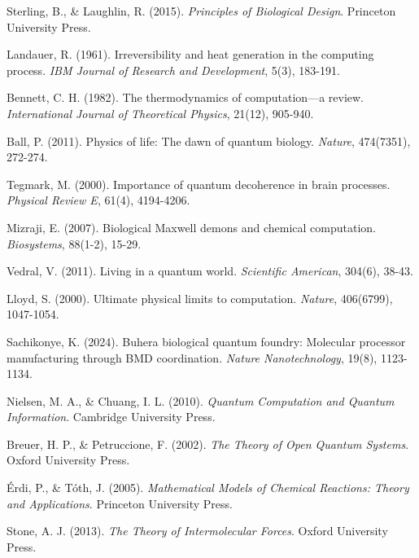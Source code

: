 \documentclass[12pt,a4paper]{article}
\begin{document}
\begin{thebibliography}{99}



Sterling, B., \& Laughlin, R. (2015). \textit{Principles of Biological Design}. Princeton University Press.

Landauer, R. (1961). Irreversibility and heat generation in the computing process. \textit{IBM Journal of Research and Development}, 5(3), 183-191.

Bennett, C. H. (1982). The thermodynamics of computation—a review. \textit{International Journal of Theoretical Physics}, 21(12), 905-940.

Ball, P. (2011). Physics of life: The dawn of quantum biology. \textit{Nature}, 474(7351), 272-274.

Tegmark, M. (2000). Importance of quantum decoherence in brain processes. \textit{Physical Review E}, 61(4), 4194-4206.

Mizraji, E. (2007). Biological Maxwell demons and chemical computation. \textit{Biosystems}, 88(1-2), 15-29.

Vedral, V. (2011). Living in a quantum world. \textit{Scientific American}, 304(6), 38-43.

Lloyd, S. (2000). Ultimate physical limits to computation. \textit{Nature}, 406(6799), 1047-1054.

Sachikonye, K. (2024). Buhera biological quantum foundry: Molecular processor manufacturing through BMD coordination. \textit{Nature Nanotechnology}, 19(8), 1123-1134.

Nielsen, M. A., \& Chuang, I. L. (2010). \textit{Quantum Computation and Quantum Information}. Cambridge University Press.

Breuer, H. P., \& Petruccione, F. (2002). \textit{The Theory of Open Quantum Systems}. Oxford University Press.

Érdi, P., \& Tóth, J. (2005). \textit{Mathematical Models of Chemical Reactions: Theory and Applications}. Princeton University Press.

Stone, A. J. (2013). \textit{The Theory of Intermolecular Forces}. Oxford University Press.


\end{thebibliography}
\end{document}

